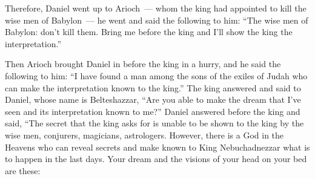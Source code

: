 \begin{inparaenum}
  
  
  
  
  
  
  
  
  
  \noindent{} Therefore, Daniel went up to Arioch~--- whom the king had appointed to kill the wise men of Babylon~--- he went and said the following to him: ``The wise men of Babylon: don't kill them. Bring me before the king and I'll show the king the interpretation.''%
  
   Then Arioch brought Daniel in before the king in a hurry, and he said the following to him: ``I have found a man among the sons of the exiles of Judah who can make the interpretation known to the king.''%
   The king answered and said to Daniel, whose name is Belteshazzar, ``Are you able to make the dream that I've seen and its interpretation known to me?''%
   Daniel answered before the king and said, ``The secret that the king asks for is unable to be shown to the king by the wise men, conjurers, magicians, astrologers.%
   However, there is a God in the Heavens who can reveal secrets and make known to King Nebuchadnezzar what is to happen in the last days. Your dream and the visions of your head on your bed are these:%
  

\end{inparaenum}
